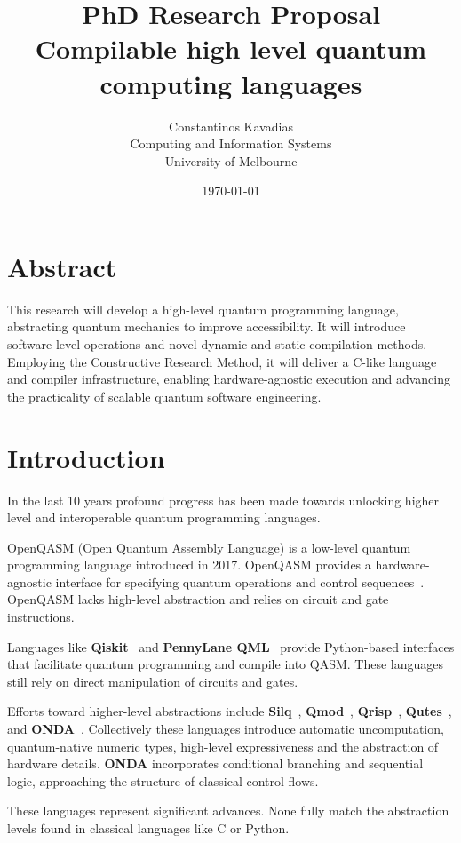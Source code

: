 \documentclass[journal,onecolumn, compsoc]{IEEEtran}
\title{PhD Research Proposal\\\large{Compilable high level quantum computing languages}}
\author{Constantinos Kavadias\\Computing and Information Systems\\University of Melbourne}
\date{\today}
\begin{document}
\maketitle

\newpage
\tableofcontents
\newpage

\section*{Abstract}
This research will develop a high-level quantum programming language, abstracting quantum mechanics to improve accessibility. 
It will introduce software-level operations and novel dynamic and static compilation methods. 
Employing the Constructive Research Method, it will deliver a C-like language and compiler infrastructure, enabling hardware-agnostic execution and advancing the practicality of scalable quantum software engineering.

\section{Introduction}
In the last 10 years profound progress has been made towards unlocking higher level and interoperable quantum programming languages.

OpenQASM (Open Quantum Assembly Language) is a low-level quantum programming language introduced in 2017. OpenQASM provides a hardware-agnostic interface for specifying quantum operations and control sequences~\cite{cross2017open}.
OpenQASM lacks high-level abstraction and relies on circuit and gate instructions.

Languages like \textbf{Qiskit}~\cite{qiskit} and \textbf{PennyLane QML}~\cite{pennylane} provide Python-based interfaces that facilitate quantum programming and compile into QASM.
These languages still rely on direct manipulation of circuits and gates.

Efforts toward higher-level abstractions include \textbf{Silq}~\cite{silq2024}, \textbf{Qmod}~\cite{qmod2025}, \textbf{Qrisp}~\cite{qrisp2024}, \textbf{Qutes}~\cite{qutes2025}, and \textbf{ONDA}~\cite{onda2024}. 
Collectively these languages introduce automatic uncomputation, quantum-native numeric types, high-level expressiveness and the abstraction of hardware details. \textbf{ONDA} incorporates conditional branching and sequential logic, approaching the structure of classical control flows.

These languages represent significant advances.
None fully match the abstraction levels found in classical languages like C or Python.
\end{document}
